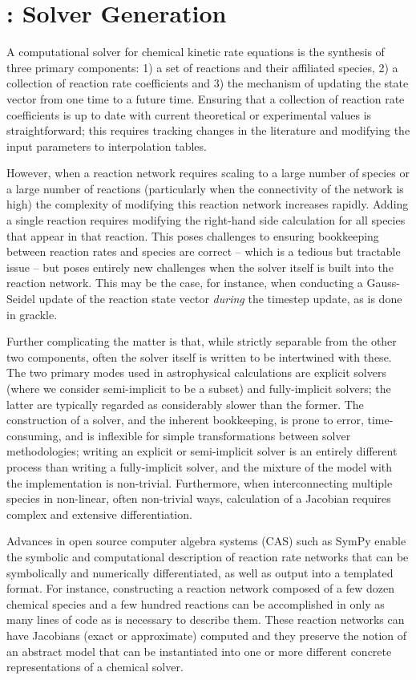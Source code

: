 \section{\dengo{}: Solver Generation}

A computational solver for chemical kinetic rate equations is the synthesis of
three primary components: 1) a set of reactions and their affiliated species,
2) a collection of reaction rate coefficients and 3) the mechanism of updating
the state vector from one time to a future time.  Ensuring that a collection of
reaction rate coefficients is up to date with current theoretical or
experimental values is straightforward; this requires tracking changes in the
literature and modifying the input parameters to interpolation tables.

However, when a reaction network requires scaling to a large number of species
or a large number of reactions (particularly when the connectivity of the
network is high) the complexity of modifying this reaction network increases
rapidly.  Adding a single reaction requires modifying the right-hand side
calculation for all species that appear in that reaction.  This poses
challenges to ensuring bookkeeping between reaction rates and species are
correct -- which is a tedious but tractable issue -- but poses entirely new
challenges when the solver itself is built into the reaction network.  This may
be the case, for instance, when conducting a Gauss-Seidel update of the
reaction state vector \textit{during} the timestep update, as is done in
grackle.

Further complicating the matter is that, while strictly separable from the
other two components, often the solver itself is written to be intertwined with
these.  The two primary modes used in astrophysical calculations are explicit
solvers (where we consider semi-implicit to be a subset) and fully-implicit
solvers; the latter are typically regarded as considerably slower than the
former.  The construction of a solver, and the inherent bookkeeping, is prone
to error, time-consuming, and is inflexible for simple transformations between
solver methodologies; writing an explicit or semi-implicit solver is an
entirely different process than writing a fully-implicit solver, and the
mixture of the model with the implementation is non-trivial.  Furthermore, when
interconnecting multiple species in non-linear, often non-trivial ways,
calculation of a Jacobian requires complex and extensive differentiation.

Advances in open source computer algebra systems (CAS) such as SymPy  enable the symbolic and computational description of reaction rate
networks that can be symbolically and numerically differentiated, as well as
output into a templated format.  For instance, constructing a reaction network
composed of a few dozen chemical species and a few hundred reactions can be
accomplished in only as many lines of code as is necessary to describe them.
These reaction networks can have Jacobians (exact or approximate) computed 
and they preserve the notion of an abstract model that can be instantiated into
one or more different concrete representations of a chemical solver.


